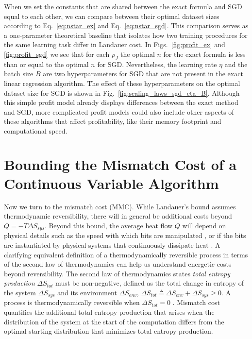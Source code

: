 \documentclass[12pt,onecolumn, margin=1in]{IEEEtran}
\begin{document}
 When we set the constants that are shared between the exact formula and SGD equal to each other, we can compare between their optimal dataset sizes according to Eq.~\eqref{eq:nstar_ex} and Eq.~\eqref{eq:nstar_sgd}. This comparison serves as a one-parameter theoretical baseline that isolates how two training procedures for the same learning task differ in Landauer cost. In Figs.~\ref{fig:profit_ex} and \ref{fig:profit_sgd} we see that for each $\rho_J$ the optimal $n$ for the exact formula is less than or equal to the optimal $n$ for SGD. Nevertheless, the learning rate $\eta$ and the batch size $B$ are two hyperparameters for SGD that are not present in the exact linear regression algorithm. The effect of these hyperparameters on the optimal dataset size for SGD is shown in Fig.~\ref{fig:scaling_laws_sgd_eta_B}.
Although this simple profit model already displays differences between the exact method and SGD, more complicated profit models could also include other aspects of these algorithms that affect profitability, like their memory footprint and computational speed.


\FloatBarrier
\section{Bounding the Mismatch Cost of a Continuous Variable Algorithm}\label{sec:mmc}



Now we turn to the mismatch cost (MMC). While Landauer's bound assumes thermodynamic reversibility, there will in general be additional costs beyond $Q = -T \Delta S_{sys}$. Beyond this bound, the average heat flow $Q$ will depend on physical details such as the speed with which bits are manipulated \cite{Seifert2007, Sivak2012}, or if the bits are instantiated by physical systems that continuously dissipate heat \cite{Esposito2021}. A clarifying equivalent definition of a thermodynamically reversible process in terms of the second law of thermodynamics can help us understand energetic costs beyond reversibility. The second law of thermodynamics states \textit{total entropy production} $\Delta S_{tot}$ must be non-negative, defined as the total change in entropy of the system $\Delta S_{sys}$ and its environment $\Delta S_{env}$, $\Delta S_{tot} \triangleq \Delta S_{env} + \Delta S_{sys} \geq 0$. A process is thermodynamically reversible when $\Delta S_{tot} = 0$ \cite{Callen,landau1980statistical, chandler}. Mismatch cost quantifies the additional total entropy production that arises when the distribution of the system at the start of the computation differs from the optimal starting distribution that minimizes total entropy production. 
\end{document}
